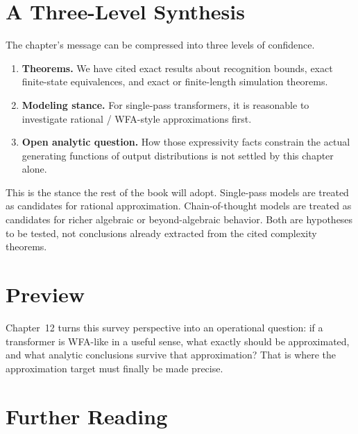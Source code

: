 \section{A Three-Level Synthesis}

The chapter's message can be compressed into three levels of confidence.

\begin{enumerate}
  \item \textbf{Theorems.} We have cited exact results about recognition bounds, exact finite-state equivalences, and exact or finite-length simulation theorems.
  \item \textbf{Modeling stance.} For single-pass transformers, it is reasonable to investigate rational / WFA-style approximations first.
  \item \textbf{Open analytic question.} How those expressivity facts constrain the actual generating functions of output distributions is not settled by this chapter alone.
\end{enumerate}

This is the stance the rest of the book will adopt. Single-pass models are treated as candidates for rational approximation. Chain-of-thought models are treated as candidates for richer algebraic or beyond-algebraic behavior. Both are hypotheses to be tested, not conclusions already extracted from the cited complexity theorems.

\section*{Preview}

Chapter~12 turns this survey perspective into an operational question: if a transformer is WFA-like in a useful sense, what exactly should be approximated, and what analytic conclusions survive that approximation? That is where the approximation target must finally be made precise.

\section*{Further Reading}

